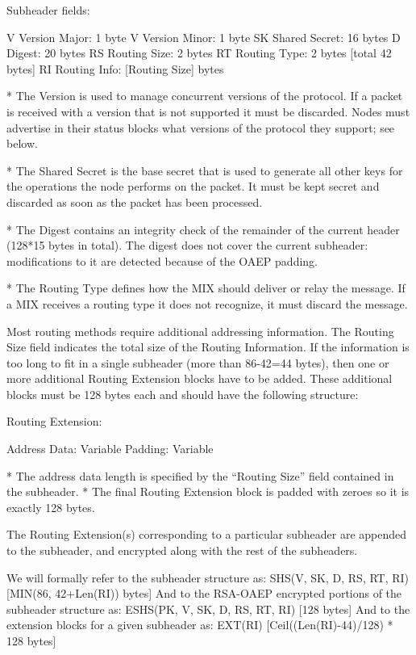 Subheader fields:

V   Version Major:   1 byte
V   Version Minor:   1 byte
SK  Shared Secret:   16 bytes
D   Digest:          20 bytes
RS  Routing Size:    2 bytes 
RT  Routing Type:    2 bytes [total 42 bytes]
RI  Routing Info:    [Routing Size] bytes

* The Version is used to manage concurrent versions of the
protocol. If a packet is received with a version that is not supported
it must be discarded. Nodes must advertise in their status blocks what
versions of the protocol they support; see below.

* The Shared Secret is the base secret that is used to generate all
other keys for the operations the node performs on the packet. It must be
kept secret and discarded as soon as the packet has been processed. 

* The Digest contains an integrity check of the remainder of the current
header (128*15 bytes in total). The digest does not cover the current
subheader: modifications to it are detected because of the OAEP padding.

* The Routing Type defines how the MIX should deliver or relay the
  message. If a MIX receives a routing type it does not recognize,
  it must discard the message.

  Most routing methods require additional addressing information.
  The Routing Size field indicates the total size of the Routing
  Information. If the information is too long to fit in a single
  subheader (more than 86-42=44 bytes), then one or more additional
  Routing Extension blocks have to be added. These additional blocks
  must be 128 bytes each and should have the following structure:
 
  Routing Extension:

    Address Data:     Variable
    Padding:          Variable

* The address data length is specified by the ``Routing Size'' field
  contained in the subheader.
* The final Routing Extension block is padded with zeroes so it is
  exactly 128 bytes.

The Routing Extension(s) corresponding to a particular subheader are
appended to the subheader, and encrypted along with the rest of the
subheaders.

We will formally refer to the subheader structure as:
SHS(V, SK, D, RS, RT, RI)     [MIN(86, 42+Len(RI)) bytes] 
And to the RSA-OAEP encrypted portions of the subheader structure as:
ESHS(PK, V, SK, D, RS, RT, RI)   [128 bytes]
And to the extension blocks for a given subheader as:
EXT(RI)                       [Ceil((Len(RI)-44)/128) * 128 bytes]

